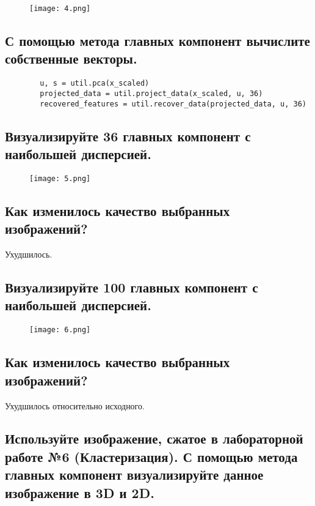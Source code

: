 \begin{figure}[h]
\centering
    \texttt{[image: 4.png]}
  \label{sec:purpose:payings}
\end{figure}

\subsection{С помощью метода главных компонент вычислите собственные векторы.}

\begin{lstlisting}
        u, s = util.pca(x_scaled)
        projected_data = util.project_data(x_scaled, u, 36)
        recovered_features = util.recover_data(projected_data, u, 36)
\end{lstlisting}

\subsection{Визуализируйте 36 главных компонент с наибольшей дисперсией.}

\begin{figure}[h]
\centering
    \texttt{[image: 5.png]}
  \label{sec:purpose:payings}
\end{figure}

\subsection{Как изменилось качество выбранных изображений?}

Ухудшилось.

\subsection{Визуализируйте 100 главных компонент с наибольшей дисперсией.}

\begin{figure}[h]
\centering
    \texttt{[image: 6.png]}
  \label{sec:purpose:payings}
\end{figure}

\subsection{Как изменилось качество выбранных изображений?}

Ухудшилось относительно исходного.

\subsection{Используйте изображение, сжатое в лабораторной работе №6 (Кластеризация). С помощью метода главных компонент визуализируйте данное изображение в 3D и 2D.}

